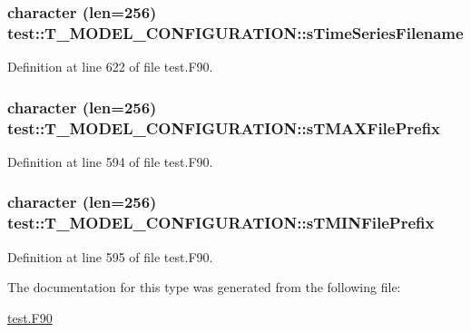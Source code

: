 \hypertarget{typetest_1_1_t___m_o_d_e_l___c_o_n_f_i_g_u_r_a_t_i_o_n_aea73cbfb45e7d00c4feba6ae77418c97}{
\subsubsection[{sTimeSeriesFilename}]{\setlength{\rightskip}{0pt plus 5cm}character (len=256) {\bf test::T\_\-MODEL\_\-CONFIGURATION::sTimeSeriesFilename}}}
\label{typetest_1_1_t___m_o_d_e_l___c_o_n_f_i_g_u_r_a_t_i_o_n_aea73cbfb45e7d00c4feba6ae77418c97}


Definition at line 622 of file test.F90.

\hypertarget{typetest_1_1_t___m_o_d_e_l___c_o_n_f_i_g_u_r_a_t_i_o_n_aeadda621ddb359ae4054df5d516d5a22}{
\subsubsection[{sTMAXFilePrefix}]{\setlength{\rightskip}{0pt plus 5cm}character (len=256) {\bf test::T\_\-MODEL\_\-CONFIGURATION::sTMAXFilePrefix}}}
\label{typetest_1_1_t___m_o_d_e_l___c_o_n_f_i_g_u_r_a_t_i_o_n_aeadda621ddb359ae4054df5d516d5a22}


Definition at line 594 of file test.F90.

\hypertarget{typetest_1_1_t___m_o_d_e_l___c_o_n_f_i_g_u_r_a_t_i_o_n_ac04fd45ee598d3753889af0f33392f9f}{
\subsubsection[{sTMINFilePrefix}]{\setlength{\rightskip}{0pt plus 5cm}character (len=256) {\bf test::T\_\-MODEL\_\-CONFIGURATION::sTMINFilePrefix}}}
\label{typetest_1_1_t___m_o_d_e_l___c_o_n_f_i_g_u_r_a_t_i_o_n_ac04fd45ee598d3753889af0f33392f9f}


Definition at line 595 of file test.F90.



The documentation for this type was generated from the following file:\begin{DoxyCompactItemize}
\item 
\hyperlink{test_8_f90}{test.F90}\end{DoxyCompactItemize}
